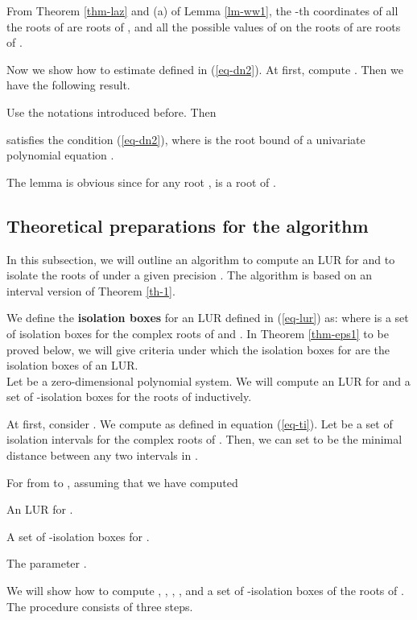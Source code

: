 \documentclass[amsthm]{JSC_LaTex_2007_Mar_12/elsart}
\def\bref#1{(\ref{#1})}
\begin{document}
From Theorem \ref{thm-laz} and (a) of Lemma \ref{lm-ww1},  the
-th coordinates of all the roots of  are roots of
, and all the possible values of  on the roots of  are roots of
.

Now we show how to estimate  defined in \bref{eq-dn2}. At
first, compute . Then we have the
following result.

\begin{lem}\label{lm-rb1}
Use the notations introduced before. Then

satisfies the condition \bref{eq-dn2}, where  is the root
bound of a univariate polynomial equation .
\end{lem}
\begin{pf}
The lemma is obvious since for any root ,  is a root of .
\end{pf}


\subsection{Theoretical preparations for the algorithm}

In this subsection, we will outline an algorithm to compute an LUR
for  and to isolate the roots of  under a given
precision . The algorithm is based on an interval version
of Theorem \ref{th-1}.

We define the {\bf isolation boxes} for an LUR defined in
\bref{eq-lur} as: {\small }
where  is a set of isolation boxes for the complex
roots of  and .
In  Theorem \ref{thm-eps1} to be proved below, we will give criteria
under which the
isolation boxes for  are the isolation boxes of an LUR.\\

Let  be a zero-dimensional polynomial
system.
We will compute an LUR for  and a set of
-isolation boxes for the roots of 
inductively.

At first, consider . We compute  as defined in equation
\bref{eq-ti}. Let  be a set of isolation intervals
for the complex roots of . Then, we can set  to be
the minimal distance between any two intervals in .

For  from  to , assuming that we have computed

\quad An LUR  for .

\quad A set of -isolation boxes for .

\quad The parameter .

We will show how to compute  , , ,
, and a set of -isolation boxes of the roots of
. The procedure consists of three steps.
\end{document}
